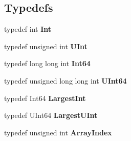 \subsection*{Typedefs}
\begin{DoxyCompactItemize}
\item 
\hypertarget{namespace_json_a08122e8005b706d982e48cca1e2119c7}{typedef int {\bfseries Int}}\label{namespace_json_a08122e8005b706d982e48cca1e2119c7}

\item 
\hypertarget{namespace_json_a800fb90eb6ee8d5d62b600c06f87f7d4}{typedef unsigned int {\bfseries U\+Int}}\label{namespace_json_a800fb90eb6ee8d5d62b600c06f87f7d4}

\item 
\hypertarget{namespace_json_ab7b47d2905da3b4ae60e4e800ec9ae5f}{typedef long long int {\bfseries Int64}}\label{namespace_json_ab7b47d2905da3b4ae60e4e800ec9ae5f}

\item 
\hypertarget{namespace_json_a01f20bce8f8229f38ff890168c0e6452}{typedef unsigned long long int {\bfseries U\+Int64}}\label{namespace_json_a01f20bce8f8229f38ff890168c0e6452}

\item 
\hypertarget{namespace_json_a218d880af853ce786cd985e82571d297}{typedef Int64 {\bfseries Largest\+Int}}\label{namespace_json_a218d880af853ce786cd985e82571d297}

\item 
\hypertarget{namespace_json_ae202ecad69725e23443f465e257456d0}{typedef U\+Int64 {\bfseries Largest\+U\+Int}}\label{namespace_json_ae202ecad69725e23443f465e257456d0}

\item 
\hypertarget{namespace_json_a8048e741f2177c3b5d9ede4a5b8c53c2}{typedef unsigned int {\bfseries Array\+Index}}\label{namespace_json_a8048e741f2177c3b5d9ede4a5b8c53c2}

\end{DoxyCompactItemize}
